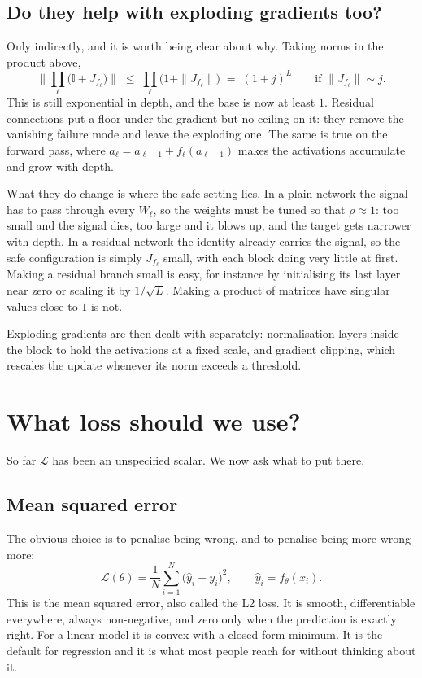 \documentclass[11pt]{article}
\newcommand{\Loss}{\mathcal{L}}
\newcommand{\yhat}{\hat{y}}
\begin{document}
\subsection*{Do they help with exploding gradients too?}

Only indirectly, and it is worth being clear about why. Taking norms in the product above,
%
\[
  \Big\| \prod_\ell \big(\mathbb{I} + J_{f_\ell}\big) \Big\|
  \;\le\; \prod_\ell \big(1 + \|J_{f_\ell}\|\big)
  \;=\; (1 + j)^{L}
  \qquad \text{if } \|J_{f_\ell}\| \sim j .
\]
%
This is still exponential in depth, and the base is now at least $1$. Residual connections
put a floor under the gradient but no ceiling on it: they remove the vanishing failure
mode and leave the exploding one. The same is true on the forward pass, where
$a_\ell = a_{\ell-1} + f_\ell(a_{\ell-1})$ makes the activations accumulate and grow with
depth.

\medskip
\noindent
What they do change is where the safe setting lies. In a plain network the signal has to
pass through every $W_\ell$, so the weights must be tuned so that $\rho \approx 1$: too
small and the signal dies, too large and it blows up, and the target gets narrower with
depth. In a residual network the identity already carries the signal, so the safe
configuration is simply $J_{f_\ell}$ small, with each block doing very little at first.
Making a residual branch small is easy, for instance by initialising its last layer near
zero or scaling it by $1/\sqrt{L}$. Making a product of matrices have singular values
close to $1$ is not.

\medskip
\noindent
Exploding gradients are then dealt with separately: normalisation layers inside the block
to hold the activations at a fixed scale, and gradient clipping, which rescales the update
whenever its norm exceeds a threshold.

\section{What loss should we use?}

So far $\Loss$ has been an unspecified scalar. We now ask what to put there.

\subsection*{Mean squared error}

The obvious choice is to penalise being wrong, and to penalise being more wrong more:
%
\[
  \Loss(\theta) = \frac{1}{N}\sum_{i=1}^{N}\big(\yhat_i - y_i\big)^{2},
  \qquad \yhat_i = f_\theta(x_i).
\]
%
This is the mean squared error, also called the L2 loss. It is smooth, differentiable
everywhere, always non-negative, and zero only when the prediction is exactly right. For a
linear model it is convex with a closed-form minimum. It is the default for regression and
it is what most people reach for without thinking about it.
\end{document}
